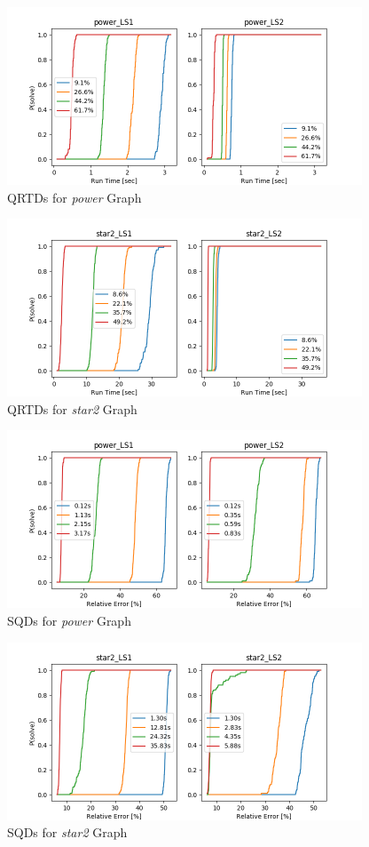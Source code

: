 \documentclass[sigconf]{acmart}
\begin{document}
\begin{figure}[h]
	\centering
	\includegraphics[width=400px]{plots/qrtd_power.png}
	\caption{QRTDs for \textit{power} Graph}
	\label{figure:qrtd_power}
\end{figure}

\begin{figure}[h]
	\centering
	\includegraphics[width=400px]{plots/qrtd_star2.png}
	\caption{QRTDs for \textit{star2} Graph}
	\label{figure:qrtd_star2}
\end{figure}

\begin{figure}[h]
	\centering
	\includegraphics[width=400px]{plots/sqd_power.png}
	\caption{SQDs for \textit{power} Graph}
	\label{figure:sqd_power}
\end{figure}

\begin{figure}[h]
	\centering
	\includegraphics[width=400px]{plots/sqd_star2.png}
	\caption{SQDs for \textit{star2} Graph}
	\label{figure:sqd_star2}
\end{figure}
\end{document}
